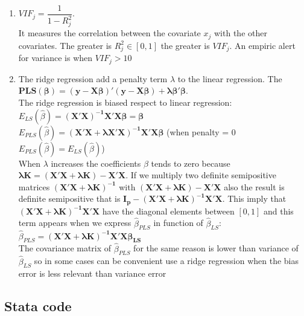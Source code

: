 \documentclass[10pt,a4paper]{article}
\begin{document}
\begin{enumerate}
			\item $ VIF_j = \dfrac{1}{1 - R_j^2} $.\\It measures the correlation between the covariate $ x_j $ with the other covariates. The greater is $ R^2_j \in [0,1]$ the greater is $ VIF_j $. An empiric alert for variance is when $ VIF_j > 10 $
			\item The ridge regression add a penalty term $ \lambda $ to the linear regression. The $ \mathbf{PLS(\beta) = (y - X \beta)'(y - X \beta) + \lambda \beta' \beta} $.\\The ridge regression is biased respect to linear regression:\\
			$ E_{LS}(\hat{\beta}) = \mathbf{(X'X)^{-1} X'X \beta = \beta} $\\
			$   E_{PLS}(\hat{\beta}) = \mathbf{(X'X + \lambda X'X)^{-1} X'X \beta} $   (when penalty = 0 $  E_{PLS}(\hat{\beta}) = E_{LS}(\hat{\beta})   $)\\
			When $ \lambda $ increases the coefficients $\beta $ tends to zero because $ \mathbf{\lambda K = (X'X + \lambda K)- X'X} $. If we multiply two definite semipositive matrices $ \mathbf{(X'X + \lambda K)^{-1}} $ with $  \mathbf{(X'X + \lambda K)- X'X}  $ also the result is definite semipositive  that is $ \mathbf{I_p - (X'X + \lambda K)^{-1}X'X}  $. This imply that $ \mathbf{(X'X + \lambda K)^{-1}X'X}    $ have the diagonal elements between $[0,1] $ and this term appears when we express $ \hat{\beta}_{PLS} $ in function of $ \hat{\beta}_{LS} $:\\
			$ \hat{\beta}_{PLS} =  \mathbf{(X'X + \lambda K)^{-1}X'X \beta_{LS}}   $\\
			The covariance matrix of $ \hat{\beta}_{PLS} $ for the same reason is lower than variance of $ \hat{\beta}_{LS} $ so in some cases can be convenient use a ridge regression when the bias error is less relevant than variance error 
	\end{enumerate}
	\subsection*{Stata code}
	
\end{document}
